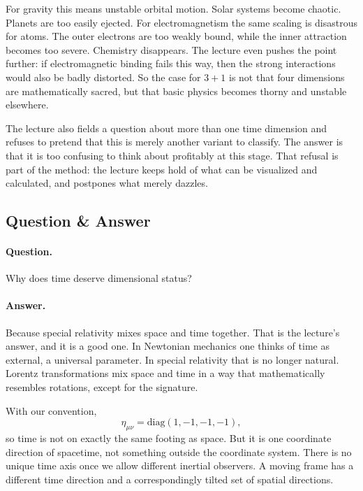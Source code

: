 For gravity this means unstable orbital motion. Solar systems become chaotic. Planets are too easily ejected. For electromagnetism the same scaling is disastrous for atoms. The outer electrons are too weakly bound, while the inner attraction becomes too severe. Chemistry disappears. The lecture even pushes the point further: if electromagnetic binding fails this way, then the strong interactions would also be badly distorted. So the case for \(3+1\) is not that four dimensions are mathematically sacred, but that basic physics becomes thorny and unstable elsewhere.

The lecture also fields a question about more than one time dimension and refuses to pretend that this is merely another variant to classify. The answer is that it is too confusing to think about profitably at this stage. That refusal is part of the method: the lecture keeps hold of what can be visualized and calculated, and postpones what merely dazzles.

\subsection{Question \& Answer}

\paragraph{Question.} Why does time deserve dimensional status?

\paragraph{Answer.} Because special relativity mixes space and time together. That is the lecture's answer, and it is a good one. In Newtonian mechanics one thinks of time as external, a universal parameter. In special relativity that is no longer natural. Lorentz transformations mix space and time in a way that mathematically resembles rotations, except for the signature.

With our convention,
\begin{equation}
\eta_{\mu\nu}=\mathrm{diag}(1,-1,-1,-1),
\end{equation}
so time is not on exactly the same footing as space. But it is one coordinate direction of spacetime, not something outside the coordinate system. There is no unique time axis once we allow different inertial observers. A moving frame has a different time direction and a correspondingly tilted set of spatial directions.

